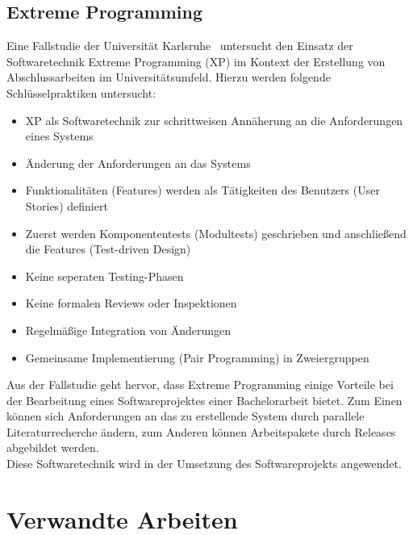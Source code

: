 \newpage

\subsection*{Extreme Programming}
Eine Fallstudie der Universität Karlsruhe~\cite{muller_2001} untersucht den Einsatz der Softwaretechnik Extreme
Programming (XP) im Kontext der Erstellung von Abschlussarbeiten im Universitätsumfeld.
Hierzu werden folgende Schlüsselpraktiken untersucht:
\begin{itemize}
    \item XP als Softwaretechnik zur schrittweisen Annäherung an die Anforderungen eines Systems
    \item Änderung der Anforderungen an das Systems
    \item Funktionalitäten (Features) werden als Tätigkeiten des Benutzers (User Stories) definiert
    \item Zuerst werden Komponententests (Modultests) geschrieben und anschließend die Features (Test-driven Design)
    \item Keine seperaten Testing-Phasen
    \item Keine formalen Reviews oder Inspektionen
    \item Regelmäßige Integration von Änderungen
    \item Gemeinsame Implementierung (Pair Programming) in Zweiergruppen
\end{itemize}
Aus der Fallstudie geht hervor, dass Extreme Programming einige Vorteile bei der Bearbeitung eines Softwareprojektes
einer Bachelorarbeit bietet.
Zum Einen können sich Anforderungen an das zu erstellende System durch parallele Literaturrecherche ändern, zum
Anderen können Arbeitspakete durch Releases abgebildet werden.\\
Diese Softwaretechnik wird in der Umsetzung des Softwareprojekts angewendet.

\newpage

\section{Verwandte Arbeiten}

